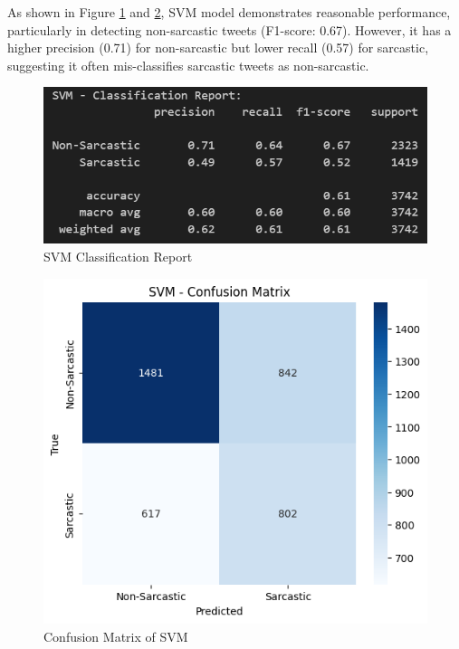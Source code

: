 \documentclass[11pt]{article}
\begin{document}
As shown in Figure \ref{fig:svmcr} and \ref{fig:svmcm}, SVM model demonstrates reasonable performance, particularly in detecting non-sarcastic tweets (F1-score: 0.67). However, it has a higher precision (0.71) for non-sarcastic but lower recall (0.57) for sarcastic, suggesting it often mis-classifies sarcastic tweets as non-sarcastic.
\begin{figure}[htbp]
    \centering
    \includegraphics[width=.8\linewidth]{pic/SVM-Report.png}
    \caption{SVM Classification Report}
    \label{fig:svmcr}
\end{figure}
\begin{figure}[htbp]
    \centering
    \includegraphics[width=.8\linewidth]{pic/SVM-Matrix.png}
    \caption{Confusion Matrix of SVM}
    \label{fig:svmcm}
\end{figure}
\end{document}
